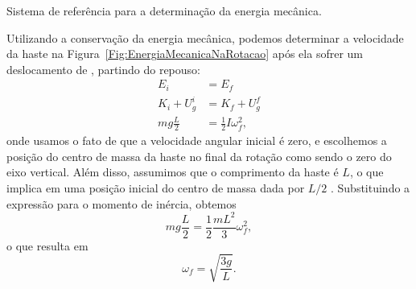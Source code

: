 
\begin{marginfigure}
\centering
{}
\caption{Sistema de referência para a determinação da energia mecânica.}
\end{marginfigure}

Utilizando a conservação da energia mecânica, podemos determinar a velocidade da haste na Figura~\ref{Fig:EnergiaMecanicaNaRotacao} após ela sofrer um deslocamento de , partindo do repouso:
\begin{align}
    E_i &= E_f \\
    K_i + U_g^i &= K_f + U_g^f \\
    mg\frac{L}{2} &= \frac{1}{2} I \omega_f^2,
\end{align}
%
onde usamos o fato de que a velocidade angular inicial é zero, e escolhemos a posição do centro de massa da haste no final da rotação como sendo o zero do eixo vertical. Além disso, assumimos que o comprimento da haste é $L$, o que implica em uma posição inicial do centro de massa dada por $L/2$ . Substituindo a expressão para o momento de inércia, obtemos
\begin{equation}
    mg\frac{L}{2} = \frac{1}{2} \frac{mL^2}{3} \omega_f^2,
\end{equation}
%
o que resulta em
\begin{equation}
    \omega_f = \sqrt{\frac{3g}{L}}.
\end{equation}

